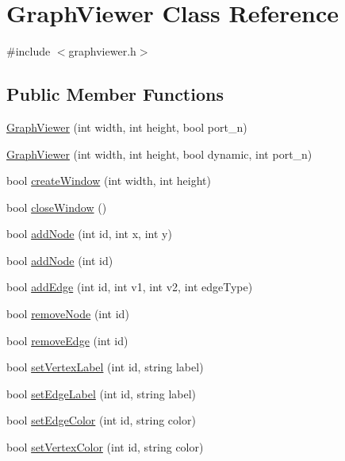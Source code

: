 \hypertarget{class_graph_viewer}{\section{Graph\-Viewer Class Reference}
\label{class_graph_viewer}
}


{\ttfamily \#include $<$graphviewer.\-h$>$}

\subsection*{Public Member Functions}
\begin{DoxyCompactItemize}
\item 
\hyperlink{class_graph_viewer_aefca44052e0000ef416ddafc828f36cc}{Graph\-Viewer} (int width, int height, bool port\-\_\-n)
\item 
\hyperlink{class_graph_viewer_ad9d7b1d8b4ba8ef18517eae0e68568a2}{Graph\-Viewer} (int width, int height, bool dynamic, int port\-\_\-n)
\item 
bool \hyperlink{class_graph_viewer_ae5247dc66449dcd21fc5d531bbbaddfa}{create\-Window} (int width, int height)
\item 
bool \hyperlink{class_graph_viewer_a85990c1eaac7feed3950960d4bd2fd4c}{close\-Window} ()
\item 
bool \hyperlink{class_graph_viewer_a5421e86ac76433876309236ba96e70a2}{add\-Node} (int id, int x, int y)
\item 
bool \hyperlink{class_graph_viewer_ab9be856eb5f45284719a3bb119ec01ea}{add\-Node} (int id)
\item 
bool \hyperlink{class_graph_viewer_aad0c1448c37f744209ffb671f1bd0015}{add\-Edge} (int id, int v1, int v2, int edge\-Type)
\item 
bool \hyperlink{class_graph_viewer_a0c418639bb911eb827cabf895915f775}{remove\-Node} (int id)
\item 
bool \hyperlink{class_graph_viewer_a9a8ee68c7c12b373affbe4069dd95d72}{remove\-Edge} (int id)
\item 
bool \hyperlink{class_graph_viewer_ac25d7d007022fda16799808ba136e909}{set\-Vertex\-Label} (int id, string label)
\item 
bool \hyperlink{class_graph_viewer_a447cca0064e785654c2105602c2961ca}{set\-Edge\-Label} (int id, string label)
\item 
bool \hyperlink{class_graph_viewer_a07ccc96707efae4aa5f3ced3dca015af}{set\-Edge\-Color} (int id, string color)
\item 
bool \hyperlink{class_graph_viewer_a8b542d7e09e81a45a74760c19233beb0}{set\-Vertex\-Color} (int id, string color)

\end{DoxyCompactItemize}
